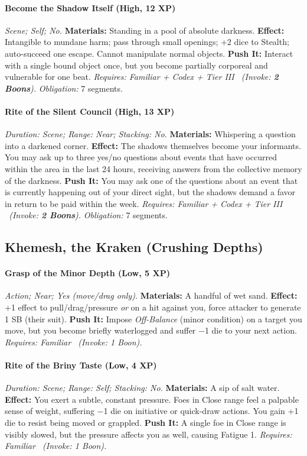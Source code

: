 \paragraph{Become the Shadow Itself (High, 12 XP)} \emph{Scene; Self; No.}
\textbf{Materials:} Standing in a pool of absolute darkness.
\textbf{Effect:} Intangible to mundane harm; pass through small openings; +2 dice to Stealth; auto-succeed one escape. Cannot manipulate normal objects.
\textbf{Push It:} Interact with a single bound object once, but you become partially corporeal and vulnerable for one beat.
\emph{Requires: Familiar + Codex + Tier III \ (\textit{Invoke:} \textbf{2 Boons}).}
\emph{Obligation:} 7 segments.

\paragraph{Rite of the Silent Council (High, 13 XP)} \emph{Duration: Scene; Range: Near; Stacking: No.}
\textbf{Materials:} Whispering a question into a darkened corner.
\textbf{Effect:} The shadows themselves become your informants. You may ask up to three yes/no questions about events that have occurred within the area in the last 24 hours, receiving answers from the collective memory of the darkness.
\textbf{Push It:} You may ask one of the questions about an event that is currently happening out of your direct sight, but the shadows demand a favor in return to be paid within the week.
\emph{Requires: Familiar + Codex + Tier III \ (\textit{Invoke:} \textbf{2 Boons}).}
\emph{Obligation:} 7 segments.

\subsection{Khemesh, the Kraken (Crushing Depths)}
\paragraph{Grasp of the Minor Depth (Low, 5 XP)} \emph{Action; Near; Yes (move/drag only).}
\textbf{Materials:} A handful of wet sand.
\textbf{Effect:} +1 effect to pull/drag/pressure \emph{or} on a hit against you, force attacker to generate 1 SB (their suit).
\textbf{Push It:} Impose \emph{Off-Balance} (minor condition) on a target you move, but you become briefly waterlogged and suffer −1 die to your next action.
\emph{Requires: Familiar \ (\textit{Invoke:} 1 Boon).}
\paragraph{Rite of the Briny Taste (Low, 4 XP)} \emph{Duration: Scene; Range: Self; Stacking: No.}
\textbf{Materials:} A sip of salt water.
\textbf{Effect:} You exert a subtle, constant pressure. Foes in Close range feel a palpable sense of weight, suffering −1 die on initiative or quick-draw actions. You gain +1 die to resist being moved or grappled.
\textbf{Push It:} A single foe in Close range is visibly slowed, but the pressure affects you as well, causing Fatigue 1.
\emph{Requires: Familiar \ (\textit{Invoke:} 1 Boon).}
